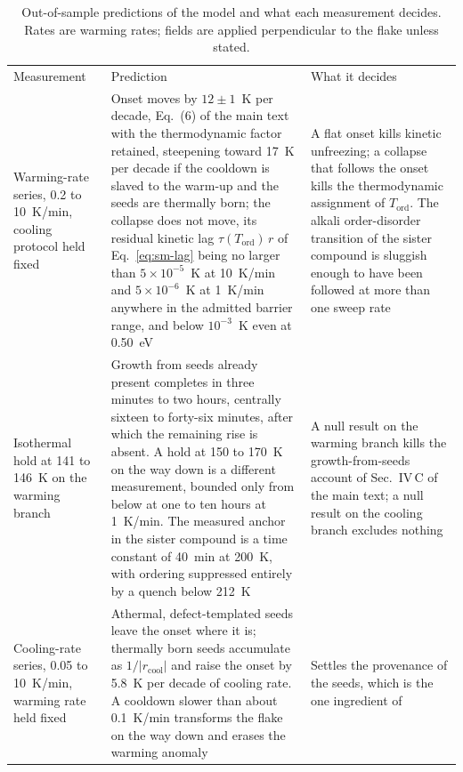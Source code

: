 \documentclass[reprint,twocolumn,prb,amsmath,amssymb,superscriptaddress,floatfix]{revtex4-2}
\newcommand{\Tcol}{T_{\mathrm{ord}}}
\begin{document}
\begin{table}[t]
  \caption{Out-of-sample predictions of the model and what each measurement decides. Rates are
  warming rates; fields are applied perpendicular to the flake unless stated.}
  \label{tab:sm-predictions}
  \renewcommand{\arraystretch}{1.15}
  \footnotesize
  \begin{ruledtabular}
  \begin{tabular}{p{}p{}p{}}
    Measurement & Prediction & What it decides \\
    \colrule
    Warming-rate series, 0.2 to 10~K/min, cooling protocol held fixed &
    Onset moves by $12\pm1$~K per decade, Eq.~(6) of the main text with the thermodynamic factor
    retained, steepening toward 17~K per decade if the cooldown is slaved to the warm-up and
    the seeds are thermally born;
    the collapse does not move, its residual kinetic lag $\tau(\Tcol)\,r$ of Eq.~\eqref{eq:sm-lag} being no
    larger than $5\times10^{-5}$~K at 10~K/min and $5\times10^{-6}$~K at 1~K/min anywhere in the
    admitted barrier range, and below $10^{-3}$~K even at 0.50~eV &
    A flat onset kills kinetic unfreezing; a collapse that follows the onset kills the
    thermodynamic assignment of $\Tcol$. The alkali order-disorder transition of the sister
    compound is sluggish enough to have been followed at more than one sweep
    rate~\cite{Ying2008} \\
    Isothermal hold at 141 to 146~K on the warming branch &
    Growth from seeds already present completes in three minutes to two hours, centrally
    sixteen to forty-six minutes, after which the remaining rise is absent. A hold at 150 to 170~K on the way
    down is a different measurement, bounded only from below at one to ten hours at 1~K/min. The
    measured anchor in the sister compound is a time constant of 40~min at 200~K, with ordering
    suppressed entirely by a quench below 212~K~\cite{Schulze2008} &
    A null result on the warming branch kills the growth-from-seeds account of
    Sec.~IV\,C of the main text; a null result on the cooling branch excludes nothing \\
    Cooling-rate series, 0.05 to 10~K/min, warming rate held fixed &
    Athermal, defect-templated seeds leave the onset where it is; thermally born seeds accumulate
    as $1/|r_{\mathrm{cool}}|$ and raise the onset by 5.8~K per decade of cooling rate. A
    cooldown slower than about 0.1~K/min transforms the flake on the way down and erases the
    warming anomaly &
    Settles the provenance of the seeds, which is the one ingredient of

\end{tabular}
\end{ruledtabular}
\end{table}
\end{document}
